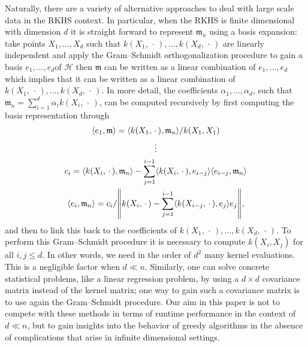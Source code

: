 \documentclass[AHL,Unicode,longabstracts,published]{cedram}
\theoremstyle{remark}
\newcommand{\cH}{\mathcal{H}}
\newcommand{\mean}{\mathfrak{m}}
\let\originalleft\left
\let\originalright\right
\renewcommand{\left}{\mathopen{}\mathclose\bgroup\originalleft}
\renewcommand{\right}{\aftergroup\egroup\originalright}
\begin{document}
Naturally, there are a variety of alternative approaches to deal with large scale data in the RKHS context. In particular, when the RKHS is finite dimensional with dimension $d$ it is straight forward to represent $\mean_n$ using a basis expansion: take points $X_1,\dots, X_d$ such that $k(X_1,\,\cdot\,), \dots, k(X_d,\,\cdot\,)$ are linearly independent and apply the Gram--Schmidt orthogonalization procedure to gain a basis $e_1,\dots, e_d$\linebreak of $\cH$ then $\mean$ can be written as a linear combination of $e_1, \dots, e_d$ which implies that it can be written as a linear combination of $k(X_1,\,\cdot\,), \dots, k(X_d,\,\cdot\,)$. In more detail, the\pagebreak{} coefficients $\alpha_1,\dots, \alpha_d$, such that $\mean_n = \sum_{i=1}^d \alpha_i k(X_i,\,\cdot\,)$, can be computed recursively by first computing the basis representation through
\begin{gather*}
\langle e_1, \mean \rangle = \langle k(X_1,\,\cdot\,), \mean_n \rangle /k(X_1,X_1) \\
\vdots \\
c_i = \langle k(X_i,\,\cdot\,), \mean_n \rangle - \sum_{j=1}^{i-1} \langle k(X_i,\,\cdot\,), e_{i-j} \rangle \langle e_{i-j}, \mean_n \rangle \\
\langle e_i, \mean_n \rangle = c_i / \left\| k(X_i,\,\cdot\,) - \sum_{j=1}^{i-1} \left\langle k(X_{i-j},\,\cdot\,), e_j \right\rangle e_j\right\|,
\end{gather*}
and then to link this back to the coefficients of $k(X_1,\,\cdot\,), \dots, k(X_d,\,\cdot\,)$. To perform this Gram--Schmidt procedure it is necessary to compute $k(X_i,X_j)$ for all $i,j \leq d$. In other words, we need in the order of $d^2$ many kernel evaluations. This is a negligible factor when $d \ll n$. Similarly, one can solve concrete statistical problems, like a linear regression problem, by using a $d\times d$ covariance matrix instead of the kernel matrix; one way to gain such a covariance matrix is to use again the Gram--Schmidt procedure. Our aim in this paper is not to compete with these methods in terms of runtime performance in the context of $d \ll n$, but to gain insights into the behavior of greedy algorithms in the absence of complications that arise in infinite dimensional settings.
\end{document}
